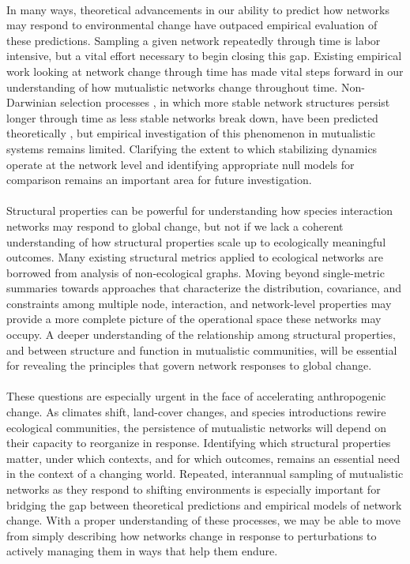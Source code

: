 \paragraph*{}
In many ways, theoretical advancements in our ability to predict how networks may respond to environmental change have outpaced empirical evaluation of these predictions. Sampling a given network repeatedly through time is labor intensive, but a vital effort necessary to begin closing this gap. Existing empirical work looking at network change through time has made vital steps forward in our understanding of how mutualistic networks change throughout time. Non-Darwinian selection processes \parencite{borrelli2015selection, saravia2022ecological}, in which more stable network structures persist longer through time as less stable networks break down, have been predicted theoretically \parencite{cai2020mutualistic}, but empirical investigation of this phenomenon in mutualistic systems remains limited. Clarifying the extent to which stabilizing dynamics operate at the network level and identifying appropriate null models for comparison remains an important area for future investigation.

\paragraph*{}
Structural properties can be powerful for understanding how species interaction networks may respond to global change, but not if we lack a coherent understanding of how structural properties scale up to ecologically meaningful outcomes. Many existing structural metrics applied to ecological networks are borrowed from analysis of non-ecological graphs. Moving beyond single-metric summaries towards approaches that characterize the distribution, covariance, and constraints among multiple node, interaction, and network-level properties may provide a more complete picture of the operational space these networks may occupy. A deeper understanding of the relationship among structural properties, and between structure and function in mutualistic communities, will be essential for revealing the principles that govern network responses to global change. 

\paragraph*{}
These questions are especially urgent in the face of accelerating anthropogenic change. As climates shift, land-cover changes, and species introductions rewire ecological communities, the persistence of mutualistic networks will depend on their capacity to reorganize in response. Identifying which structural properties matter, under which contexts, and for which outcomes, remains an essential need in the context of a changing world. Repeated, interannual sampling of mutualistic networks as they respond to shifting environments is especially important for bridging the gap between theoretical predictions and empirical models of network change. With a proper understanding of these processes, we may be able to move from simply describing how networks change in response to perturbations to actively managing them in ways that help them endure. 

